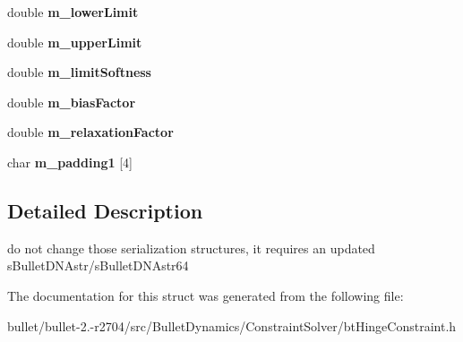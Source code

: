 \begin{DoxyCompactItemize}
\item 
\hypertarget{structbt_hinge_constraint_double_data2_adf997d0dfd642bba6bb0d63977002d71}{double {\bfseries m\+\_\+lower\+Limit}}\label{structbt_hinge_constraint_double_data2_adf997d0dfd642bba6bb0d63977002d71}

\item 
\hypertarget{structbt_hinge_constraint_double_data2_a5fdda2cd7254610a65e924a9927fc101}{double {\bfseries m\+\_\+upper\+Limit}}\label{structbt_hinge_constraint_double_data2_a5fdda2cd7254610a65e924a9927fc101}

\item 
\hypertarget{structbt_hinge_constraint_double_data2_ae03225be5c3f9986816fb5096f9b63f2}{double {\bfseries m\+\_\+limit\+Softness}}\label{structbt_hinge_constraint_double_data2_ae03225be5c3f9986816fb5096f9b63f2}

\item 
\hypertarget{structbt_hinge_constraint_double_data2_a0e249f5a84fefbe5e65aa703e297ea57}{double {\bfseries m\+\_\+bias\+Factor}}\label{structbt_hinge_constraint_double_data2_a0e249f5a84fefbe5e65aa703e297ea57}

\item 
\hypertarget{structbt_hinge_constraint_double_data2_a61f1241b2bef82c1d7a9655cca24b341}{double {\bfseries m\+\_\+relaxation\+Factor}}\label{structbt_hinge_constraint_double_data2_a61f1241b2bef82c1d7a9655cca24b341}

\item 
\hypertarget{structbt_hinge_constraint_double_data2_a428ed679b7231ed4bcc8307601b3cba4}{char {\bfseries m\+\_\+padding1} \mbox{[}4\mbox{]}}\label{structbt_hinge_constraint_double_data2_a428ed679b7231ed4bcc8307601b3cba4}

\end{DoxyCompactItemize}


\subsection{Detailed Description}
do not change those serialization structures, it requires an updated s\+Bullet\+D\+N\+Astr/s\+Bullet\+D\+N\+Astr64 

The documentation for this struct was generated from the following file\+:\begin{DoxyCompactItemize}
\item 
bullet/bullet-\/2.-\/r2704/src/\+Bullet\+Dynamics/\+Constraint\+Solver/bt\+Hinge\+Constraint.\+h\end{DoxyCompactItemize}
